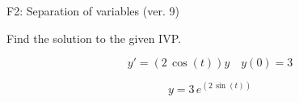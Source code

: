\begin{exercise}
  \begin{exerciseTitle}F2: Separation of variables (ver. 9)\end{exerciseTitle}
  \begin{exerciseStatement}
    
Find the solution to the given IVP.

    
\[y'=( 2 \, \cos\left(t\right) )y\hspace{1em} y(0)= 3\]

  \end{exerciseStatement}
  \begin{exerciseAnswer}
    
\[y= 3 \, e^{\left(2 \, \sin\left(t\right)\right)}\]

  \end{exerciseAnswer}
\end{exercise}